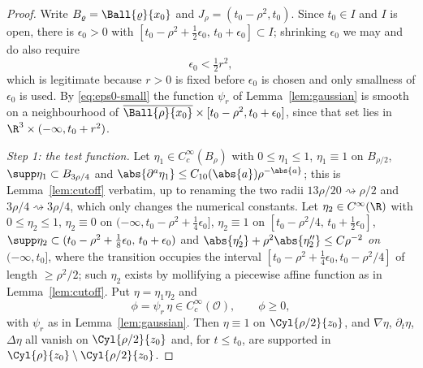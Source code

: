\documentclass[11pt,reqno]{amsart}
\begin{document}
\begin{proof}
Write $B_{\varrho}=\Ball{\varrho}{x_{0}}$ and $J_{\rho}=(t_{0}-\rho^{2},t_{0})$.
Since $t_{0}\in I$ and $I$ is open, there is $\epsilon_{0}>0$ with
$[t_{0}-\rho^{2}+\tfrac12\epsilon_{0},\,t_{0}+\epsilon_{0}]\subset I$; shrinking
$\epsilon_{0}$ we may and do also require
\begin{equation}\label{eq:eps0-small}
  \epsilon_{0}<\tfrac12 r^{2},
\end{equation}
which is legitimate because $r>0$ is fixed before $\epsilon_{0}$ is chosen and
only smallness of $\epsilon_{0}$ is used. By \eqref{eq:eps0-small} the function
$\psi_{r}$ of Lemma~\ref{lem:gaussian} is smooth on a neighbourhood of
$\overline{\Ball{\rho}{x_{0}}}\times[t_{0}-\rho^{2},t_{0}+\epsilon_{0}]$, since
that set lies in $\R^{3}\times(-\infty,t_{0}+r^{2})$.

\emph{Step 1: the test function.} Let $\eta_{1}\in C_{c}^{\infty}(B_{\rho})$ with
$0\le\eta_{1}\le1$, $\eta_{1}\equiv1$ on $B_{\rho/2}$,
$\supp\eta_{1}\subset B_{3\rho/4}$ and
$\abs{\partial^{a}\eta_{1}}\le C_{10}(\abs{a})\rho^{-\abs{a}}$; this is
Lemma~\ref{lem:cutoff} verbatim, up to renaming the two radii
$13\rho/20\rightsquigarrow\rho/2$ and $3\rho/4\rightsquigarrow3\rho/4$, which
only changes the numerical constants. Let $\eta_{2}\in C^{\infty}(\R)$ with
$0\le\eta_{2}\le1$, $\eta_{2}\equiv0$ on
$(-\infty,t_{0}-\rho^{2}+\tfrac14\epsilon_{0}]$, $\eta_{2}\equiv1$ on
$[t_{0}-\rho^{2}/4,\,t_{0}+\tfrac12\epsilon_{0}]$, $\supp\eta_{2}\subset
(t_{0}-\rho^{2}+\tfrac18\epsilon_{0},\,t_{0}+\epsilon_{0})$ and
$\abs{\eta_{2}'}+\rho^{2}\abs{\eta_{2}''}\le C\rho^{-2}$ \emph{on}
$(-\infty,t_{0}]$, where the transition occupies the interval
$[t_{0}-\rho^{2}+\tfrac14\epsilon_{0},t_{0}-\rho^{2}/4]$ of length
$\ge\rho^{2}/2$; such $\eta_{2}$ exists by mollifying a piecewise affine
function as in Lemma~\ref{lem:cutoff}. Put $\eta=\eta_{1}\eta_{2}$ and
\[
  \phi=\psi_{r}\,\eta\in C_{c}^{\infty}(\mathcal{O}),\qquad \phi\ge0 ,
\]
with $\psi_{r}$ as in Lemma~\ref{lem:gaussian}. Then $\eta\equiv1$ on
$\Cyl{\rho/2}{z_{0}}$, and $\nabla\eta$, $\partial_{t}\eta$, $\Delta\eta$ all
vanish on $\Cyl{\rho/2}{z_{0}}$ and, for $t\le t_{0}$, are supported in
$\Cyl{\rho}{z_{0}}\setminus\Cyl{\rho/2}{z_{0}}$.


\end{proof}
\end{document}
